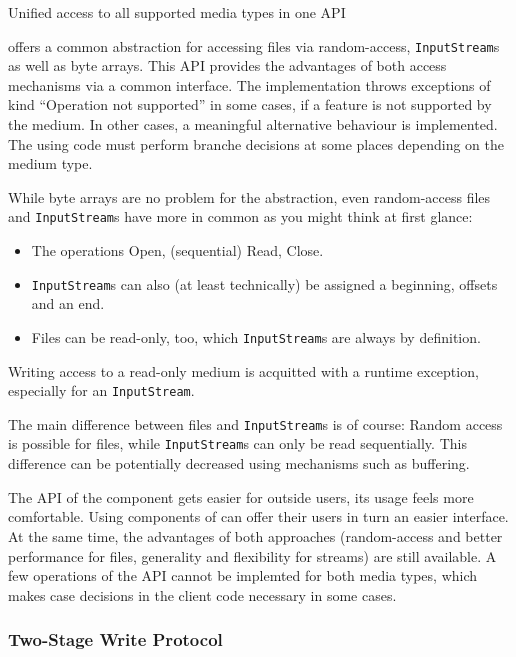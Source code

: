{%
Unified access to all supported media types in one API
}
{%
\COMPmedia{} offers a common abstraction for accessing files via random-access, \texttt{InputStream}s as well as byte arrays. This API provides the advantages of both access mechanisms via a common interface. The implementation throws exceptions of kind ``Operation not supported'' in some cases, if a feature is not supported by the medium. In other cases, a meaningful alternative behaviour is implemented. The using code must perform branche decisions at some places depending on the medium type.

While byte arrays are no problem for the abstraction, even random-access files and \texttt{InputStream}s have more in common as you might think at first glance:
\begin{itemize}
	\item The operations Open, (sequential) Read, Close.
	\item \texttt{InputStream}s can also (at least technically) be assigned a beginning, offsets and an end.
	\item Files can be read-only, too, which \texttt{InputStream}s are always by definition.
\end{itemize}

Writing access to a read-only medium is acquitted with a runtime exception, especially for an \texttt{InputStream}.

The main difference between files and \texttt{InputStream}s is of course: Random access is possible for files, while \texttt{InputStream}s can only be read sequentially. This difference can be potentially decreased using mechanisms such as buffering.
}
{%
The API of the component \COMPmedia{} gets easier for outside users, its usage feels more comfortable. Using components of \COMPmedia{} can offer their users in turn an easier interface. At the same time, the advantages of both approaches (random-access and better performance for files, generality and flexibility for streams) are still available. 
}
{%
A few operations of the API cannot be implemted for both media types, which makes case decisions in the client code necessary in some cases.
}


\subsubsection{Two-Stage Write Protocol}
\label{sec:GrundSchreiben}

